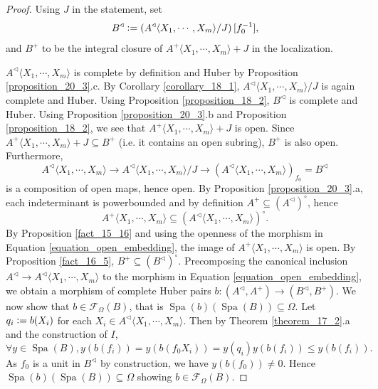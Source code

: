 \documentclass[8pt]{article}
\numberwithin{equation}{section}
\DeclareMathOperator{\Spa}{Spa}
\newcommand{\defeq}{\vcentcolon=}
\newcommand{\cF}[0]{\mathcal{F}}
\newcommand{\comppol}[1]{\langle X_1,\cdots, X_{#1}\rangle}
\begin{document}
\begin{proof}
    Using $J$ in the statement, set 
    \begin{equation*}
        B^\triangleleft \defeq \left(A^\triangleleft\comppol{m}/J\right)[f_0^{-1}],
    \end{equation*}
    and $B^+$ to be the integral closure of $A^+\comppol{m}+J$ in the localization. 
    \par $A^\triangleleft\comppol{m}$ is complete by definition and Huber by Proposition \ref{proposition_20_3}.c. By Corollary \ref{corollary_18_1}, $A^\triangleleft\comppol{m}/J$ is again complete and Huber. Using Proposition \ref{proposition_18_2}, $B^\triangleleft$ is complete and Huber. Using Proposition \ref{proposition_20_3}.b and Proposition \ref{proposition_18_2}, we see that $A^+\comppol{m}+J$ is open. Since $A^+\comppol{m}+J\subseteq B^+$ (i.e. it contains an open subring), $B^+$ is also open. 
    Furthermore, 
    \begin{equation}
        \label{equation_open_embedding}
        A^\triangleleft\comppol{m}\to A^\triangleleft\comppol{m}/J\to (A^\triangleleft\comppol{m})_{f_0}=B^\triangleleft
    \end{equation}
    is a composition of open maps, hence open. By Proposition \ref{proposition_20_3}.a, each indeterminant is powerbounded and by definition $A^+\subseteq(A^\triangleleft)^\circ$, hence 
    \begin{equation*}
        A^+\comppol{m}\subseteq (A^\triangleleft\comppol{m})^\circ.
    \end{equation*}
    By Proposition \ref{fact_15_16} and using the openness of the morphism in Equation \eqref{equation_open_embedding}, the image of $A^+\comppol{m}$ is open. By Proposition \ref{fact_16_5}, $B^+\subseteq (B^\triangleleft)^\circ$.
    Precomposing the canonical inclusion $A^\triangleleft\to A^\triangleleft\comppol{m}$ to the morphism in Equation \eqref{equation_open_embedding}, we obtain a morphism of complete Huber pairs $b:(A^\triangleleft,A^+)\to(B^\triangleleft,B^+)$.
    We now show that $b\in\cF_\Omega(B)$, that is $\Spa(b)(\Spa(B))\subseteq\Omega$. Let $q_i \defeq b(X_i)$ for each $X_i\in A^\triangleleft\comppol{m}$. Then by Theorem \ref{theorem_17_2}.a and the construction of $I$,
    \begin{equation*}
        \forall y\in \Spa(B), y(b(f_i)) = y(b(f_0X_i)) = y(q_i)y(b(f_i))\leq y(b(f_i)).
    \end{equation*}
    As $f_0$ is a unit in $B^\triangleleft$ by construction, we have $y(b(f_0))\not=0$. Hence $\Spa(b)(\Spa(B))\subseteq\Omega$ showing $b\in\cF_\Omega(B)$.

\end{proof}
\end{document}
